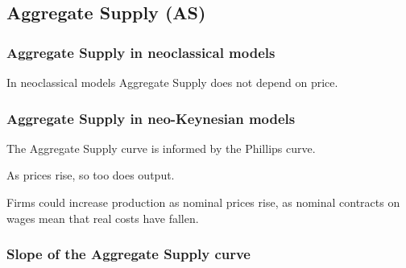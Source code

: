 
\subsection{Aggregate Supply (AS)}

\subsubsection{Aggregate Supply in neoclassical models}

In neoclassical models Aggregate Supply does not depend on price.

\subsubsection{Aggregate Supply in neo-Keynesian models}

The Aggregate Supply curve is informed by the Phillips curve.

As prices rise, so too does output.

Firms could increase production as nominal prices rise, as nominal contracts on wages mean that real costs have fallen.

\subsubsection{Slope of the Aggregate Supply curve}

